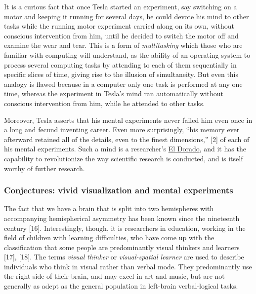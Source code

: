 \documentclass[
  11pt,
  a4paper,
]{article}
\begin{document}
It is a curious fact that once Tesla started an experiment, say
switching on a motor and keeping it running for several days, he could
devote his mind to other tasks while the running motor experiment
carried along on its own, without conscious intervention from him, until
he decided to switch the motor off and examine the wear and tear. This
is a form of \emph{multitasking} which those who are familiar with
computing will understand, as the ability of an operating system to
process several computing tasks by attending to each of them
sequentially in specific slices of time, giving rise to the illusion of
simultaneity. But even this analogy is flawed because in a computer only
one task is performed at any one time, whereas the experiment in Tesla's
mind ran automatically without conscious intervention from him, while he
attended to other tasks.

Moreover, Tesla asserts that his mental experiments never failed him
even once in a long and fecund inventing career. Even more surprisingly,
``his memory ever afterward retained all of the details, even to the
finest dimensions,'' {[}2{]} of each of his mental experiments. Such a
mind is a researcher's
\href{https://www.thefreedictionary.com/El+dorado}{El Dorado}, and it
has the capability to revolutionize the way scientific research is
conducted, and is itself worthy of further research.

\hypertarget{conjectures-vivid-visualization-and-mental-experiments}{%
\subsubsection{Conjectures: vivid visualization and mental
experiments}\label{conjectures-vivid-visualization-and-mental-experiments}}

The fact that we have a brain that is split into two hemispheres with
accompanying hemispherical asymmetry has been known since the nineteenth
century {[}16{]}. Interestingly, though, it is researchers in education,
working in the field of children with learning difficulties, who have
come up with the classification that some people are predominantly
visual thinkers and learners {[}17{]}, {[}18{]}. The terms \emph{visual
thinker} or \emph{visual-spatial learner} are used to describe
individuals who think in visual rather than verbal mode. They
predominantly use the right side of their brain, and may excel in art
and music, but are not generally as adept as the general population in
left-brain verbal-logical tasks.
\end{document}
